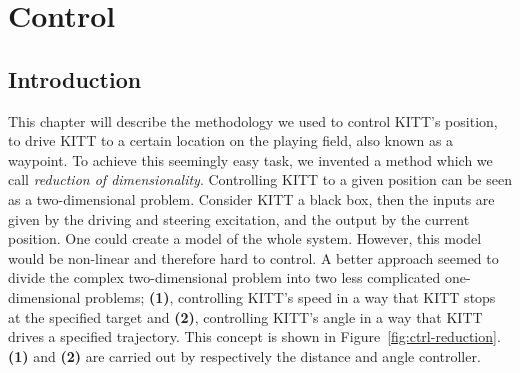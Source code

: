 \documentclass[11pt,titlepage]{report}
\begin{document}
\chapter{Control}
\label{ch:control}
\section{Introduction}
This chapter will describe the methodology we used to control KITT's position, to drive KITT to a certain location on the playing field, also known as a waypoint. To achieve this seemingly easy task, we invented a method which we call \textit{reduction of dimensionality}. Controlling KITT to a given position can be seen as a two-dimensional problem. Consider KITT a black box, then the inputs are given by the driving and steering excitation, and the output by the current position. One could create a model of the whole system. However, this model would be non-linear and therefore hard to control. A better approach seemed to divide the complex two-dimensional problem into two less complicated one-dimensional problems; \textbf{(1)}, controlling KITT's speed in a way that KITT stops at the specified target and \textbf{(2)}, controlling KITT's angle in a way that KITT drives a specified trajectory. This concept is shown in Figure~\ref{fig:ctrl-reduction}. \textbf{(1)} and \textbf{(2)} are carried out by respectively the distance and angle controller. 
\end{document}
